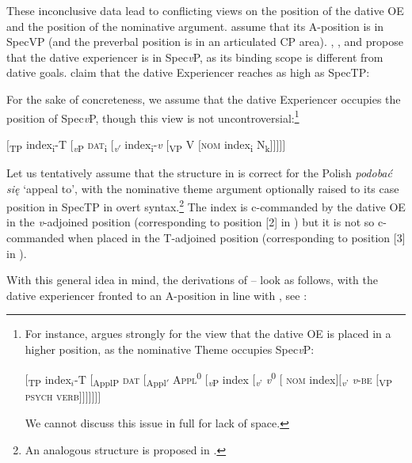 \documentclass[output=paper,modfonts,nonflat
]{langsci/langscibook}
\begin{document}
These inconclusive data lead to conflicting views on the position of the dative OE and the position of the nominative argument. \cite{jimenezfernandez2016} assume that its A-position is in SpecVP (and the preverbal position is in an articulated CP area). \citet{bondaruk2007}, \citet{tajsner2008}, and \citet{bondaruketal2017} propose that the dative experiencer is in Spec\textit{v}P, as its binding scope is different from dative goals. \cite{miechowicz2008} claim that the dative Experiencer reaches as high as SpecTP:

For the sake of concreteness, we assume that the dative Experiencer occupies the position of Spec\textit{v}P, though this view is not uncontroversial:\footnote{\label{fn25}For instance, \cite{cuervo2003} argues strongly for the view that the dative OE is placed in a higher position, as the nominative Theme occupies Spec\textit{v}P:

\ea
$[$\textsubscript{TP} index$_i$-T $[$\textsubscript{ApplP} \textsc{dat} $[$\textsubscript{Appl$'$}  \textsc{Appl}\textsuperscript{0} $[$\textsubscript{\textit{v}P} index $[$\textsubscript{\textit{v}$’$} \textit{v}\textsuperscript{0} $[$ \textsc{nom} index$][$\textsubscript{\textit{v}’} \textit{v}-\textsc{be} $[$\textsubscript{VP} \textsc{psych verb}$]]]]]]]$
\z

\noindent We cannot discuss this issue in full for lack of space.}  

\ea \label{ex:witkos:49}
$[$\textsubscript{TP} index\textsubscript{i}-T $[$\textsubscript{\textit{v}P}  \textsc{dat}\textsubscript{i} $[$\textsubscript{\textit{v}$'$} index\textsubscript{i}-\textit{v} $[$\textsubscript{VP} V $[$\textsc{nom} index\textsubscript{i} N\textsubscript{k}$]]]]]$\\
\z

\noindent Let us tentatively assume that the structure in  is correct for the Polish \textit{podobać się} `appeal to', with the nominative theme argument optionally raised to its case position in SpecTP in overt syntax.\footnote{\label{fn26}An analogous structure is proposed in \cite{klimek2004}.} The index is c-commanded by the dative OE in the \textit{v}-adjoined position (corresponding to position [2] in ) but it is not so c-commanded when placed in the T-adjoined position (corresponding to position [3] in ). 

With this general idea in mind, the derivations of -- look as follows, with the dative experiencer fronted to an A-position in line with \cite{germain2015}, see :
\end{document}
